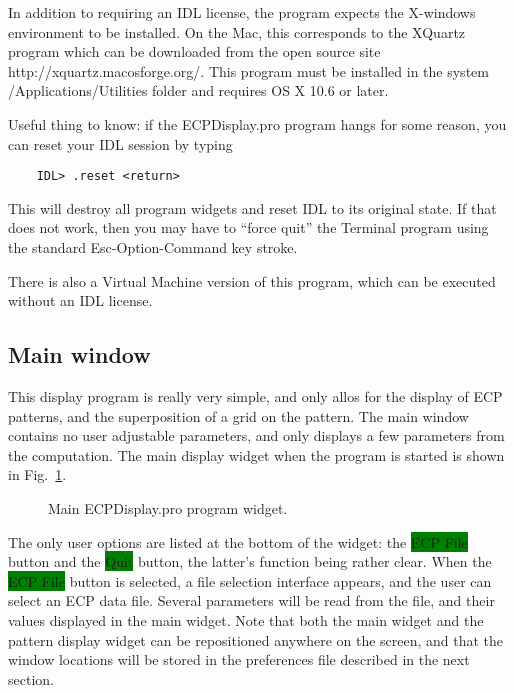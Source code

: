 \documentclass[DIV=calc, paper=letter, fontsize=11pt]{scrartcl}	 %
\newcommand{\button}[1]{\colorbox{green}{\textsf{#1}} button}
\begin{document}
In addition to requiring an IDL license, the program expects the X-windows environment to be installed.  On the Mac, this corresponds
to the \textsf{XQuartz} program which can be downloaded from the open source site \textsf{http://xquartz.macosforge.org/}.  This program
must be installed in the system /Applications/Utilities folder and requires OS X 10.6 or later.

Useful thing to know: if the \textsf{ECPDisplay.pro}  program hangs for some reason, you can reset your IDL session by typing
\begin{verbatim}
	IDL> .reset <return>
\end{verbatim}
This will destroy all program widgets and reset IDL to its original state.  If that does not work, then you may have to ``force quit'' the Terminal program
using the standard Esc-Option-Command key stroke.

There is also a Virtual Machine version of this program, which can be executed without an IDL license.

\subsection{Main window\label{sec:idlmain}}
This display program is really very simple, and only allos for the display of ECP patterns, and 
the superposition of a grid on the pattern.
The main window contains no user adjustable parameters, and only displays a few parameters from the computation.
The main display widget when the program is started is shown in Fig.~\ref{fig:widget1}.  

\begin{figure}[h]
\leavevmode\centering
{}
\caption{\label{fig:widget1}Main \textsf{ECPDisplay.pro} program widget.}
\end{figure}

The only user options are listed at the bottom of the widget: the \button{ECP File} and the \button{Quit}, the latter's function being 
rather clear.  When the \button{ECP File} is selected, a file selection interface appears, and the user can select an ECP data file. 
Several parameters will be read from the file, and their values displayed in the main widget.  Note that both the main widget and 
the pattern display widget can be repositioned anywhere on the screen, and that the window locations will be stored in the preferences
file described in the next section.  
\end{document}
